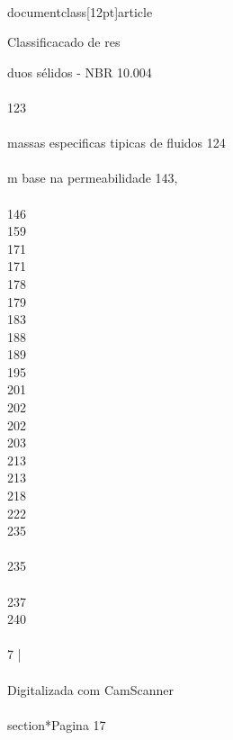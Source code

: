 \\documentclass[12pt]{article}
\begin{document}
Classificacado de res\\{duos sélidos - NBR 10.004\\
\\
123\\
\\
massas especificas tipicas de fluidos 124\\
\\
m base na permeabilidade 143,\\
\\
146\\
159\\
171\\
171\\
178\\
179\\
183\\
188\\
189\\
195\\
201\\
202\\
202\\
203\\
213\\
213\\
218\\
222\\
235\\
\\
235\\
\\
237\\
240\\
\\
7 |\\
\\
Digitalizada com CamScanner\\

\\section*{Pagina 17}

}
\end{document}
